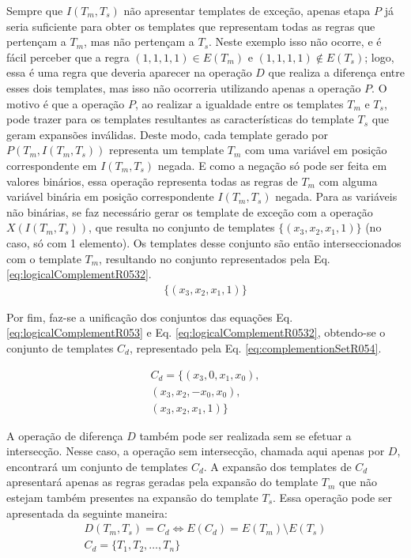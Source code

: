 Sempre que $I(T_m, T_s)$ não apresentar templates de exceção, apenas etapa $P$ já seria suficiente para obter os templates que representam todas as regras que pertençam a $T_m$, mas não pertençam a $T_s$. Neste exemplo isso não ocorre, e é fácil perceber que a regra $(1,1,1,1) \in E(T_m)$ e $(1,1,1,1) \not\in E(T_s)$; logo, essa é uma regra que deveria aparecer na operação $D$ que realiza a diferença entre esses dois templates, mas isso não ocorreria utilizando apenas a operação $P$. O motivo é que a operação $P$, ao realizar a igualdade entre os templates $T_m$ e $T_s$, pode trazer para os templates resultantes as características do template $T_s$ que geram expansões inválidas. Deste modo, cada template gerado por $P(T_m, I(T_m, T_s))$ representa um template $T_m$ com uma variável em posição correspondente em $I(T_m, T_s)$ negada. E como a negação só pode ser feita em valores binários, essa operação representa todas as regras de $T_m$ com alguma variável binária em posição correspondente $I(T_m, T_s)$ negada. Para as variáveis não binárias, se faz necessário gerar os template de exceção com a operação $X(I(T_m, T_s))$, que resulta no conjunto de templates $\{(x_3, x_2, x_1, 1)\}$ (no caso, só com 1 elemento). Os templates desse conjunto são então interseccionados com o template $T_m$, resultando no conjunto representados pela Eq. \eqref{eq:logicalComplementR0532}.
\begin{equation}
\begin{split}
\{(x_3, x_2, x_1, 1)\}
\end{split}
\label{eq:logicalComplementR0532}
\end{equation}

Por fim, faz-se a unificação dos conjuntos das equações Eq. \eqref{eq:logicalComplementR053} e Eq. \eqref{eq:logicalComplementR0532}, obtendo-se o conjunto de templates $C_{d}$, representado pela Eq. \ref{eq:complementionSetR054}.

\begin{equation}
\begin{split}
C_{d} = \{(x_3, 0, x_1, x_0), \\(x_3, x_2, -x_0, x_0),\\ (x_3, x_2, x_1, 1)\}
\end{split}
\label{eq:complementionSetR054}
\end{equation}

A operação de diferença $D$ também pode ser realizada sem se efetuar a intersecção. Nesse caso, a operação sem intersecção, chamada aqui apenas por $D$, encontrará um conjunto de templates $C_d$. A expansão dos templates de $C_{d}$ apresentará apenas as regras geradas pela expansão do template $T_m$ que não estejam também presentes na expansão do template $T_s$. Essa operação pode ser apresentada da seguinte maneira:
\begin{equation}
\begin{split}
D(T_m,T_s)= C_d \Leftrightarrow E(C_d) = E(T_m) \setminus E(T_s) \\
C_d = \{T_1,T_2,\dots, T_n\}\\
\end{split}
\end{equation}

